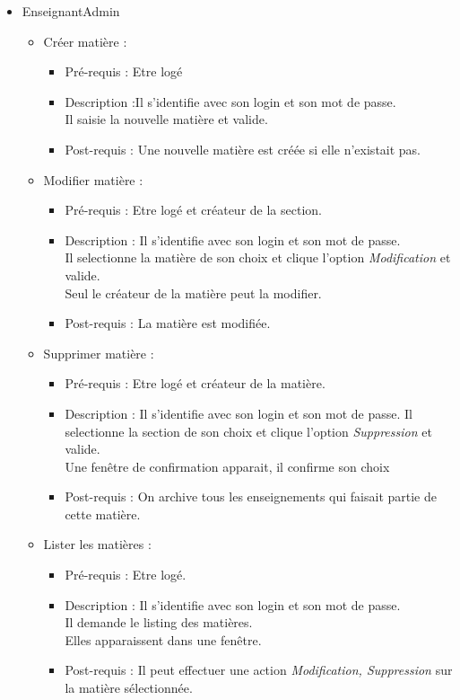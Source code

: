	\begin{itemize}
	\item EnseignantAdmin
		\begin{itemize}
		\item Cr{\'e}er mati{\`e}re :
			\begin{itemize}
			\item Pr{\'e}-requis : Etre log{\'e} 
			\item Description :Il s'identifie avec son login et son mot de passe. \\
			Il saisie la nouvelle mati{\`e}re et valide.
			\item Post-requis : Une nouvelle mati{\`e}re est cr{\'e}{\'e}e si elle n'existait pas.
			\end{itemize}

		\item Modifier mati{\`e}re :
			\begin{itemize}
			\item Pr{\'e}-requis : Etre log{\'e} et cr{\'e}ateur de la section.
			\item Description : Il s'identifie avec son login et son mot de passe.\\
			Il selectionne la mati{\`e}re de son choix et clique l'option {\it Modification} et valide.\\
			Seul le cr{\'e}ateur de la mati{\`e}re peut la modifier.
			\item Post-requis : La mati{\`e}re est modifi{\'e}e.
			\end{itemize}

		\item Supprimer mati{\`e}re :
			\begin{itemize}
			\item Pr{\'e}-requis : Etre log{\'e} et cr{\'e}ateur de la mati{\`e}re.
			\item Description : Il s'identifie avec son login et son mot de passe.
			Il selectionne la section de son choix et clique l'option {\it Suppression} et valide.\\
			Une fen{\^e}tre de confirmation apparait, il confirme son choix
			\item Post-requis : On archive tous les enseignements qui faisait partie de cette mati{\`e}re.
			\end{itemize}
		\item Lister les mati{\`e}res :
			\begin{itemize}
			\item Pr{\'e}-requis : Etre log{\'e}.
			\item Description : Il s'identifie avec son login et son mot de passe.\\
			Il demande le listing des mati{\`e}res.\\
			Elles apparaissent dans une fen{\^e}tre.
			\item Post-requis : Il peut effectuer une action {\it Modification, Suppression} sur la mati{\`e}re s{\'e}lectionn{\'e}e.\\
			\end{itemize}
		\end{itemize}
	\end{itemize}

